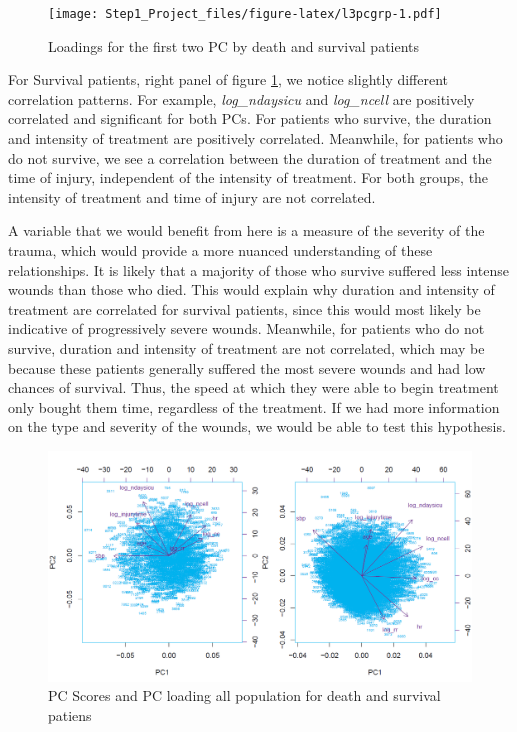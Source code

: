 \documentclass[
]{article}
\begin{document}
\begin{figure}
\centering
\texttt{[image: Step1\_Project\_files/figure-latex/l3pcgrp-1.pdf]}
\caption{Loadings for the first two PC by death and survival
patients\label{fig:l3pcgrp}}
\end{figure}

For Survival patients, right panel of figure \ref{fig:l3pcgrp}, we
notice slightly different correlation patterns. For example,
\emph{log\_ndaysicu} and \emph{log\_ncell} are positively correlated and
significant for both PCs. For patients who survive, the duration and
intensity of treatment are positively correlated. Meanwhile, for
patients who do not survive, we see a correlation between the duration
of treatment and the time of injury, independent of the intensity of
treatment. For both groups, the intensity of treatment and time of
injury are not correlated.

A variable that we would benefit from here is a measure of the severity
of the trauma, which would provide a more nuanced understanding of these
relationships. It is likely that a majority of those who survive
suffered less intense wounds than those who died. This would explain why
duration and intensity of treatment are correlated for survival
patients, since this would most likely be indicative of progressively
severe wounds. Meanwhile, for patients who do not survive, duration and
intensity of treatment are not correlated, which may be because these
patients generally suffered the most severe wounds and had low chances
of survival. Thus, the speed at which they were able to begin treatment
only bought them time, regardless of the treatment. If we had more
information on the type and severity of the wounds, we would be able to
test this hypothesis.

\begin{figure}
\centering
\includegraphics{../figure_output/pca_group_biplot}
\caption{PC Scores and PC loading all population for death and survival
patiens}
\end{figure}
\end{document}
